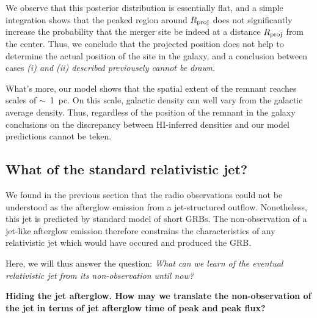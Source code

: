 We observe that this posterior distribution is essentially flat, and a simple integration shows that the peaked region around $R_\rm{proj}$ does not significantly increase the probability that the merger site be indeed at a distance $R_\rm{proj}$ from the center. Thus, we conclude that the projected position does not help to determine the actual position of the site in the galaxy, and a conclusion between cases \it{(i)} and \it{(ii)} described previousely cannot be drawn.


What's more, our model shows that the spatial extent of the remnant reaches scales of $\sim$~1~pc. On this scale, galactic density can well vary from the galactic average density. Thus, regardless of the position of the remnant in the galaxy conclusions on the discrepancy between HI-inferred densities and our model predictions cannot be teken.



\subsection{What of the standard relativistic jet?}

We found in the previous section that the radio observations could not be understood as the afterglow emission from a jet-structured outflow. Nonetheless, this jet is predicted by standard model of short GRBs. The non-observation of a jet-like afterglow emission therefore constrains the characteristics of any relativistic jet which would have occured and produced the GRB.


Here, we will thus answer the question: \it{What can we learn of the eventual relativistic jet from its non-observation until now?}

\bf{Hiding the jet afterglow.} How may we translate the non-observation of the jet in terms of jet afterglow time of peak and peak flux?

